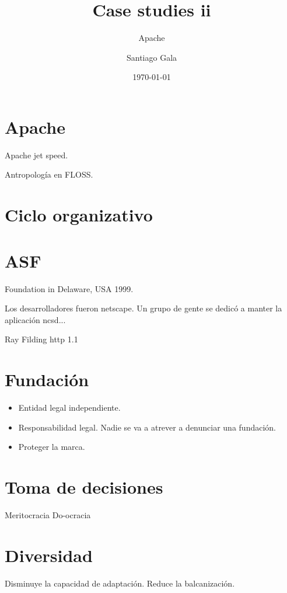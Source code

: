 \documentclass[11pt]{scrartcl}
\title{\textbf{Case studies ii\\}}
\subtitle{Apache}
\author{Santiago Gala}
\date{\today}
\begin{document}
\maketitle

\section{Apache}

Apache jet speed.

Antropología en FLOSS.

\section{Ciclo organizativo}

\section{ASF}

Foundation in Delaware, USA 1999.

Los desarrolladores fueron netscape.
Un grupo de gente se dedicó a manter la aplicación ncsd...

Ray Filding http 1.1

\section{Fundación}

\begin{itemize}
    \item Entidad legal independiente.
    \item Responsabilidad legal. Nadie se va a atrever a denunciar una fundación.
    \item Proteger la marca.
\end{itemize}

\section{Toma de decisiones}

Meritocracia
Do-ocracia

\section{Diversidad}

Disminuye la capacidad de adaptación. Reduce la balcanización.
\end{document}

